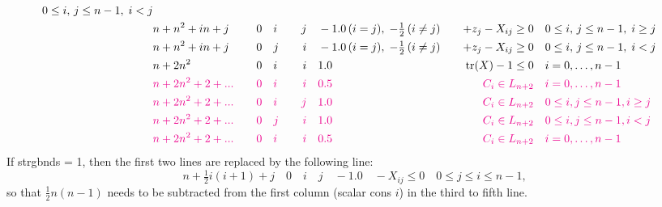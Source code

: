 \documentclass[11pt,a4paper]{article}
\DeclareMathOperator{\tr}{tr}
\theoremstyle{definition}
\begin{document}
{\[\begin{aligned}
    0 \leq i,\, j \leq n-1,\; i < j \\
    &n+n^2+in+j \quad & 0 \quad & i \quad &
    j \quad & -1.0\, (i = j),\; -\tfrac{1}{2}\, (i\neq j) \quad & +z_j -
    X_{ij} \geq 0 \quad & 0 \leq i,\, j \leq n-1,\; i \geq j \\
    &n+n^2+in+j \quad & 0 \quad & j \quad &
    i \quad & -1.0\, (i = j),\; -\tfrac{1}{2}\, (i\neq j) \quad & +z_j -
    X_{ij} \geq 0 \quad & 0 \leq i,\, j \leq n-1,\; i < j \\
    &n+2n^2 \quad & 0 \quad & i \quad & i \quad & 1.0 \quad & \tr(X) - 1
    \leq 0 \quad & i = 0,\dots,n-1 \\
    &{\color{magenta} n+2n^2+2+...} \quad & {\color{magenta} 0} \quad &
    {\color{magenta} i} \quad & {\color{magenta} i} \quad &
    {\color{magenta} 0.5} \quad & {\color{magenta} C_i \in L_{n+2}} \quad &
    {\color{magenta} i = 0,\dots,n-1} \\
    &{\color{magenta} n+2n^2+2+...} \quad & {\color{magenta} 0} \quad &
    {\color{magenta} i} \quad & {\color{magenta} j} \quad &
    {\color{magenta} 1.0} \quad & {\color{magenta} C_i \in L_{n+2}} \quad &
    {\color{magenta} 0 \leq i,j\leq n-1, i \geq j} \\
    &{\color{magenta} n+2n^2+2+...} \quad & {\color{magenta} 0} \quad &
    {\color{magenta} j} \quad & {\color{magenta} i} \quad &
    {\color{magenta} 1.0} \quad & {\color{magenta} C_i \in L_{n+2}} \quad &
    {\color{magenta} 0 \leq i,j\leq n-1, i < j} \\
    &{\color{magenta} n+2n^2+2+...} \quad & {\color{magenta} 0} \quad &
    {\color{magenta} i} \quad & {\color{magenta} i} \quad &
    {\color{magenta} 0.5} \quad & {\color{magenta} C_i \in L_{n+2}} \quad &
    {\color{magenta} i = 0,\dots,n-1} \\
  \end{aligned}
\]
\noindent
{\color{blue} If strgbnds = 1, then the first two lines are replaced by the
  following line:
  \[
    n+\tfrac{1}{2}i(i+1)+j \quad  0 \quad i \quad  j \quad  -1.0
    \quad - X_{ij} \leq 0 \quad 0 \leq j \leq i \leq n-1,
  \]
  so that $\tfrac{1}{2}n(n-1)$ needs to be subtracted from the first column
  (scalar cons $i$) in the third to fifth line.\\
}

}
\end{document}
